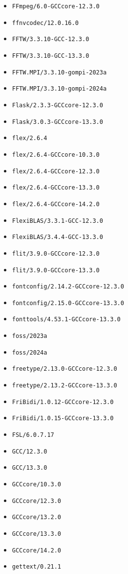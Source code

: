 \begin{multicols}{3}
\begin{itemize}
\item \verb|FFmpeg/6.0-GCCcore-12.3.0|
\item \verb|ffnvcodec/12.0.16.0|
\item \verb|FFTW/3.3.10-GCC-12.3.0|
\item \verb|FFTW/3.3.10-GCC-13.3.0|
\item \verb|FFTW.MPI/3.3.10-gompi-2023a|
\item \verb|FFTW.MPI/3.3.10-gompi-2024a|
\item \verb|Flask/2.3.3-GCCcore-12.3.0|
\item \verb|Flask/3.0.3-GCCcore-13.3.0|
\item \verb|flex/2.6.4|
\item \verb|flex/2.6.4-GCCcore-10.3.0|
\item \verb|flex/2.6.4-GCCcore-12.3.0|
\item \verb|flex/2.6.4-GCCcore-13.3.0|
\item \verb|flex/2.6.4-GCCcore-14.2.0|
\item \verb|FlexiBLAS/3.3.1-GCC-12.3.0|
\item \verb|FlexiBLAS/3.4.4-GCC-13.3.0|
\item \verb|flit/3.9.0-GCCcore-12.3.0|
\item \verb|flit/3.9.0-GCCcore-13.3.0|
\item \verb|fontconfig/2.14.2-GCCcore-12.3.0|
\item \verb|fontconfig/2.15.0-GCCcore-13.3.0|
\item \verb|fonttools/4.53.1-GCCcore-13.3.0|
\item \verb|foss/2023a|
\item \verb|foss/2024a|
\item \verb|freetype/2.13.0-GCCcore-12.3.0|
\item \verb|freetype/2.13.2-GCCcore-13.3.0|
\item \verb|FriBidi/1.0.12-GCCcore-12.3.0|
\item \verb|FriBidi/1.0.15-GCCcore-13.3.0|
\item \verb|FSL/6.0.7.17|
\item \verb|GCC/12.3.0|
\item \verb|GCC/13.3.0|
\item \verb|GCCcore/10.3.0|
\item \verb|GCCcore/12.3.0|
\item \verb|GCCcore/13.2.0|
\item \verb|GCCcore/13.3.0|
\item \verb|GCCcore/14.2.0|
\item \verb|gettext/0.21.1|

\end{itemize}
\end{multicols}

